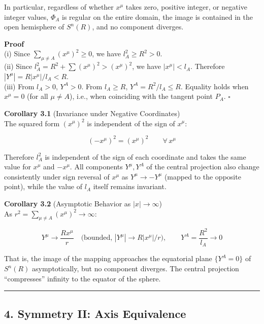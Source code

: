 \documentclass[a4paper,11pt]{article}
\theoremstyle{definition}
\begin{document}
In particular, regardless of whether \(x^\mu\) takes zero, positive integer, or negative integer values, \(\Phi_A\) is regular on the entire domain, the image is contained in the open hemisphere of \(S^n(R)\), and no component diverges.

\textbf{Proof}\\
(i) Since \(\sum_{\mu \neq A}(x^\mu)^2 \geq 0\), we have \(l_A^2 \geq R^2 > 0\).\\
(ii) Since \(l_A^2 = R^2 + \sum(x^\mu)^2 > (x^\mu)^2\), we have \(|x^\mu| < l_A\). Therefore \(|Y^\mu| = R|x^\mu|/l_A < R\).\\
(iii) From \(l_A > 0\), \(Y^A > 0\). From \(l_A \geq R\), \(Y^A = R^2/l_A \leq R\). Equality holds when \(x^\mu = 0\) (for all \(\mu \neq A\)), i.e., when coinciding with the tangent point \(P_A\). \(\square\)

\textbf{Corollary 3.1} (Invariance under Negative Coordinates)\\
The squared form \((x^\mu)^2\) is independent of the sign of \(x^\mu\):

\[(-x^\mu)^2 = (x^\mu)^2 \qquad \forall\, x^\mu \tag{3.1}\]

Therefore \(l_A^2\) is independent of the sign of each coordinate and takes the same value for \(x^\mu\) and \(-x^\mu\). All components \(Y^\mu, Y^A\) of the central projection also change consistently under sign reversal of \(x^\mu\) as \(Y^\mu \to -Y^\mu\) (mapped to the opposite point), while the value of \(l_A\) itself remains invariant.

\textbf{Corollary 3.2} (Asymptotic Behavior as \(|x| \to \infty\))\\
As \(r^2 = \sum_{\mu \neq A}(x^\mu)^2 \to \infty\):

\[Y^\mu \to \frac{Rx^\mu}{r} \quad \text{(bounded, $|Y^\mu| \to R|x^\mu|/r$)}, \qquad Y^A = \frac{R^2}{l_A} \to 0 \tag{3.2}\]

That is, the image of the mapping approaches the equatorial plane \(\{Y^A = 0\}\) of \(S^n(R)\) asymptotically, but no component diverges. The central projection ``compresses'' infinity to the equator of the sphere.

\begin{center}\rule{0.5\linewidth}{0.5pt}\end{center}

\subsection{4. Symmetry II: Axis Equivalence}\label{symmetry-ii-axis-equivalence}
\end{document}
